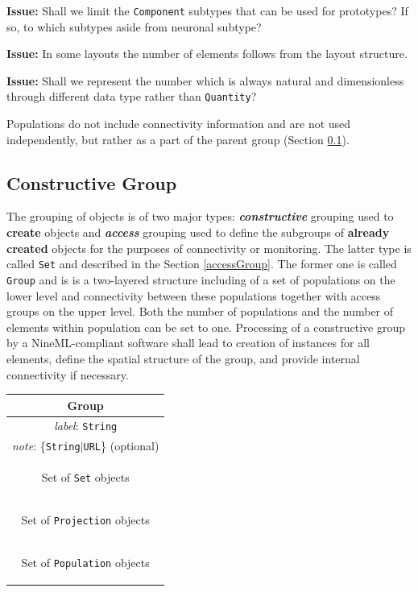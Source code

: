 \documentclass{article}
\newcommand{\issue}[1]{%
\begin{center}
\colorbox{issuecolor}{\parbox{0.8\linewidth}{\textbf{Issue:} #1}}
\end{center}%
}
\begin{document}
\issue{Shall we limit the {\tt Component} subtypes that can be used
for prototypes? If so, to which subtypes aside from neuronal subtype?}

\issue{In some layouts the number of elements follows from the layout
structure.}

\issue{Shall we represent the number which is always natural and
dimensionless through different data type rather than {\tt Quantity}?}

Populations do not include connectivity information and are not used
independently, but rather as a part of the parent group (Section
\ref{grouping}).


\subsection{Constructive Group}
\label{grouping}

The grouping of objects is of two major types: \emph{\bf constructive}
grouping used to {\bf create} objects and \emph{\bf access} grouping used
to define the subgroups of {\bf already created} objects for the purposes
of connectivity or monitoring. The latter type is called {\tt Set} and
described in the Section \ref{accessGroup}. The former one is called
{\tt Group} and is is a two-layered structure including of a set of
populations on the lower level and connectivity between these populations
together with access groups on the upper level. Both the number of
populations and the number of elements within population can be set to
one. Processing of a constructive group by a NineML-compliant
software shall lead to creation of instances for all elements, define the
spatial structure of the group, and provide internal connectivity if
necessary.

\begin{table}[htb]
\center
\begin{tabular}{|c|}
\hline
\hline
Group \\
\hline
\hline
{\em label}: {\tt String} \\
\hline
{\em note}: \{{\tt String}$|${\tt URL}\} (optional)\\
\hline
\colorbox{issuecolor}{\parbox{0.4\linewidth}
{\center Set of {\tt Set} objects}} \\
\hline
\colorbox{issuecolor}{\parbox{0.4\linewidth}
{\center Set of {\tt Projection} objects}} \\
\hline
\colorbox{issuecolor}{\parbox{0.4\linewidth}
{\center Set of {\tt Population} objects}} \\
\hline
\end{tabular}
\end{table}
\end{document}
